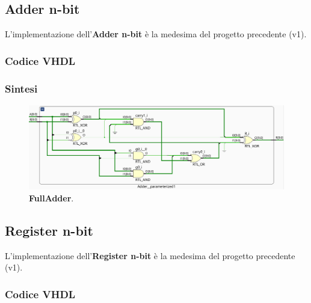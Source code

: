\documentclass[12pt]{article}
\begin{document}
    \subsection{Adder n-bit}
        L'implementazione dell'\textbf{Adder n-bit} è la medesima del progetto precedente (v1).

        \subsubsection{Codice VHDL}
           
            
        \subsubsection{Sintesi}
            \begin{figure}[ht]
                \centering
                \includegraphics[scale=0.45]{Adder.png}
                \caption{\textbf{FullAdder}.}
            \end{figure}

    \subsection{Register n-bit}
        L'implementazione dell'\textbf{Register n-bit} è la medesima del progetto precedente (v1).

        \subsubsection{Codice VHDL}
           
            
\end{document}
